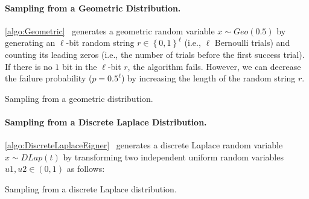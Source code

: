 \paragraph{Sampling from a Geometric Distribution.}
\autoref{algo:Geometric}~\cite{walker1974fast, googleDP2019} generates a geometric random variable $x\sim Geo\left(0.5\right) $ by generating an $\ell$-bit random string $r\in \left\{0,1\right\}^\ell $ (i.e., $\ell$ Bernoulli trials) and counting its leading zeros (i.e., the number of trials before the first success trial). If there is no $1$ bit in the $\ell$-bit $r$, the algorithm fails. However, we can decrease the failure probability ($p=0.5^{\ell}$) by increasing the length of the random string $r$.

\begin{algorithm}[tbh!]
    \centering
    \caption{Sampling from a geometric distribution.}
    \label{algo:Geometric}
\end{algorithm}
\FloatBarrier

\paragraph{Sampling from a Discrete Laplace Distribution.}
\autoref{algo:DiscreteLaplaceEigner}~\cite{eigner2014differentially} generates a discrete Laplace random variable $x\sim DLap\left(t\right) $ by transforming two independent uniform random variables $u1, u2 \in \left(0,1\right) $ as follows:

\begin{algorithm}[tbh!]
    \centering
    \caption{Sampling from a discrete Laplace distribution.}
    \label{algo:DiscreteLaplaceEigner}
\end{algorithm}
\FloatBarrier



